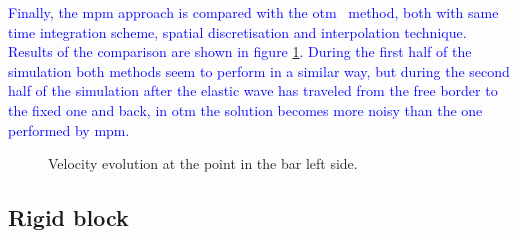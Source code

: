 \documentclass[preprint,12pt,a4paper]{elsarticle}
\begin{document}
\textcolor{blue}{Finally, the \acrshort{mpm} approach is compared with the \acrfull{otm}~\cite{Li2010} method, both with same time integration scheme, spatial discretisation and interpolation technique. Results of the comparison are shown in figure \ref{fig:Dyka-OTM-MPM}. During the first half of the simulation both methods seem to perform in a similar way, but during the second half of the simulation after the elastic wave has traveled from the free border to
the fixed one and back, in \acrshort{otm} the solution becomes more noisy than the one performed by \acrshort{mpm}.}   
\begin{figure}
  \centering
  \caption{Velocity evolution at the point in the bar left side.}
  \label{fig:Dyka-OTM-MPM}
\end{figure}

\subsection{Rigid block}
\label{sec:andersen-block}
\end{document}
